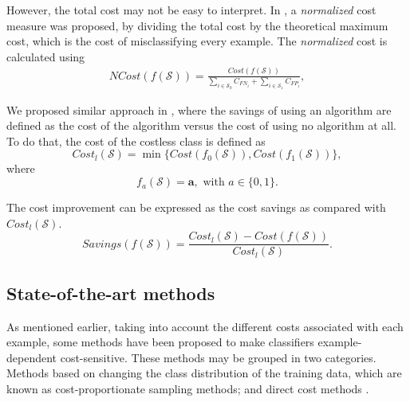 However, the total cost may not be easy to interpret. In \citep{Whitrow2008}, a 
  \textit{normalized} cost measure was proposed, by dividing the total cost by the theoretical 
  maximum cost, which is the cost of misclassifying every example. The \textit{normalized} cost is 
  calculated using
  \begin{align}\label{eq:ncost}
    NCost(f(\mathcal{S})) = \frac{Cost(f(\mathcal{S}))}
    {\sum_{i \in \mathcal{S}_0} C_{FN_i} + 
    \sum_{i \in \mathcal{S}_1} C_{FP_i}},
  \end{align} 
  
  We proposed similar approach in \citep{CorreaBahnsen2014b}, where the savings of using an 
  algorithm  are defined as the cost of the algorithm versus the cost of using no algorithm at all. 
  To do that, the cost of the costless class is defined as 
  \begin{equation}
    Cost_l(\mathcal{S}) = \min \{Cost(f_0(\mathcal{S})), Cost(f_1(\mathcal{S}))\},
  \end{equation}
  where 
  \begin{equation}\label{eq:f_a}
    f_a(\mathcal{S}) = \mathbf{a}, \text{ with } a\in \{0,1\}.
  \end{equation}

  The cost improvement can be expressed as the cost savings as compared with $Cost_l(\mathcal{S})$. 
  \begin{equation}\label{eq:savings}
    Savings(f(\mathcal{S})) = \frac{ Cost_l(\mathcal{S}) - Cost(f(\mathcal{S}))}
    {Cost_l(\mathcal{S})}.
  \end{equation} 


\subsection{State-of-the-art methods}

    As mentioned earlier, taking into account the different costs associated with each example, 
    some methods have been proposed to make classifiers example-dependent cost-sensitive. These 
    methods may be grouped in two categories. Methods based on changing the class distribution of 
    the training data, which are known as cost-proportionate sampling methods; and direct cost 
    methods \citep{Wang2013}.
  
